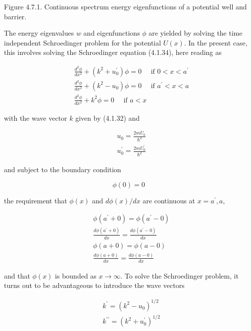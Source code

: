 \documentclass{article}
\begin{document}
Figure 4.7.1. Continuous spectrum energy eigenfunctions of a potential well and barrier.

The energy eigenvalues $w$ and eigenfunctions $\phi$ are yielded by solving the time independent Schroedinger problem for the potential $U(x)$. In the present case, this involves solving the Schroedinger equation (4.1.34), here reading as
 
\begin{align*}
& \frac{d^{2} \phi}{d x^{2}}+\left(k^{2}+u_{0}^{\prime}\right) \phi=0 \quad \text { if } 0<x<a^{\prime}  \tag{4.7.2a}\\
& \frac{d^{2} \phi}{d x^{2}}+\left(k^{2}-u_{0}\right) \phi=0 \quad \text { if } a^{\prime}<x<a  \tag{4.7.2b}\\
& \frac{d^{2} \phi}{d x^{2}}+k^{2} \phi=0 \quad \text { if } a<x \tag{4.7.2c}
\end{align*}
 
with the wave vector $k$ given by (4.1.32) and
 
\begin{align*}
& u_{0}=\frac{2 m U_{0}}{\hbar^{2}}  \tag{4.7.3a}\\
& u_{0}^{\prime}=\frac{2 m U_{0}^{\prime}}{\hbar^{2}} \tag{4.7.3b}
\end{align*}
 
and subject to the boundary condition
 
\begin{equation*}
\phi(0)=0 \tag{4.7.4}
\end{equation*}
 
the requirement that $\phi(x)$ and $d \phi(x) / d x$ are continuous at $x=a^{\prime}, a$,
 
\begin{align*}
& \phi\left(a^{\prime}+0\right)=\phi\left(a^{\prime}-0\right)  \tag{4.7.5}\\
& \frac{d \phi\left(a^{\prime}+0\right)}{d x}=\frac{d \phi\left(a^{\prime}-0\right)}{d x}  \tag{4.7.6}\\
& \phi(a+0)=\phi(a-0)  \tag{4.7.7}\\
& \frac{d \phi(a+0)}{d x}=\frac{d \phi(a-0)}{d x} \tag{4.7.8}
\end{align*}
 
and that $\phi(x)$ is bounded as $x \rightarrow \infty$.
To solve the Schroedinger problem, it turns out to be advantageous to introduce the wave vectors
 
\begin{align*}
& k^{\prime}=\left(k^{2}-u_{0}\right)^{1 / 2}  \tag{4.7.9a}\\
& k^{\prime \prime}=\left(k^{2}+u_{0}^{\prime}\right)^{1 / 2} \tag{4.7.9~b}
\end{align*}
 
\end{document}
